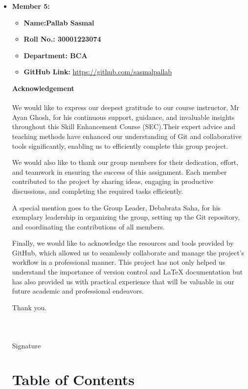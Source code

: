 \documentclass[a4paper,15pt]{article}
\begin{document}
\begin{itemize}[leftmargin=1.5cm]
    \item \textbf{Member 5:} 
    \begin{itemize}[leftmargin=1.5cm]
        \item \textbf{Name:Pallab Sasmal } 
        \item \textbf{Roll No.: 30001223074 } 
        \item \textbf{Department: BCA } 
        \item \textbf{GitHub Link:} \url{https://github.com/sasmalpallab}
\end{itemize}

\vspace{1cm}
\newpage
\textbf{Acknowledgement}\\ \\

We would like to express our deepest gratitude to our course instructor, Mr Ayan Ghosh, for his continuous support, guidance, and invaluable insights throughout this Skill Enhancement Course (SEC).Their expert advice and teaching methods have enhanced our understanding of Git and collaborative tools significantly, enabling us to efficiently complete this group project.

We would also like to thank our group members for their dedication, effort, and teamwork in ensuring the success of this assignment. Each member contributed to the project by sharing ideas, engaging in productive discussions, and completing the required tasks efficiently.

A special mention goes to the Group Leader, Debabrata Saha, for his exemplary leadership in organizing the group, setting up the Git repository, and coordinating the contributions of all members.

Finally, we would like to acknowledge the resources and tools provided by GitHub, which allowed us to seamlessly collaborate and manage the project's workflow in a professional manner. 
This project has not only helped us understand the importance of version control and LaTeX documentation but has also provided us with practical experience that will be valuable in our future academic and professional endeavors.

Thank you.\\ \\ \\ \\
Signature

\newpage

\section*{Table of Contents}
\tableofcontents


\end{itemize}
\end{document}
